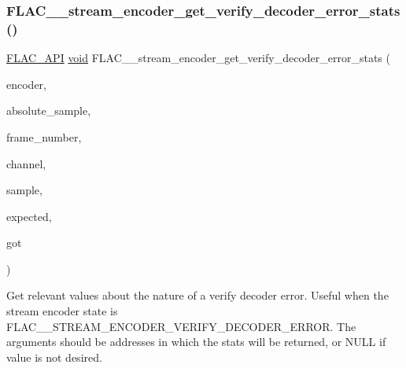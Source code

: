 \subsubsection{\texorpdfstring{FLAC\_\_stream\_encoder\_get\_verify\_decoder\_error\_stats()}{FLAC\_\_stream\_encoder\_get\_verify\_decoder\_error\_stats()}}
{\footnotesize\ttfamily \mbox{\hyperlink{group__flac__export_ga56ca07df8a23310707732b1c0007d6f5}{F\+L\+A\+C\+\_\+\+A\+PI}} \mbox{\hyperlink{_s_d_l__opengles2__gl2ext_8h_ae5d8fa23ad07c48bb609509eae494c95}{void}} F\+L\+A\+C\+\_\+\+\_\+stream\+\_\+encoder\+\_\+get\+\_\+verify\+\_\+decoder\+\_\+error\+\_\+stats (\begin{DoxyParamCaption}\item[{const \mbox{\hyperlink{struct_f_l_a_c_____stream_encoder}{F\+L\+A\+C\+\_\+\+\_\+\+Stream\+Encoder}} $\ast$}]{encoder,  }\item[{\mbox{\hyperlink{ordinals_8h_aa78c8c70a3eb8a58af7436f278acde8e}{F\+L\+A\+C\+\_\+\+\_\+uint64}} $\ast$}]{absolute\+\_\+sample,  }\item[{unsigned $\ast$}]{frame\+\_\+number,  }\item[{unsigned $\ast$}]{channel,  }\item[{unsigned $\ast$}]{sample,  }\item[{\mbox{\hyperlink{ordinals_8h_a33fd77bfe6d685541a0c034a75deccdc}{F\+L\+A\+C\+\_\+\+\_\+int32}} $\ast$}]{expected,  }\item[{\mbox{\hyperlink{ordinals_8h_a33fd77bfe6d685541a0c034a75deccdc}{F\+L\+A\+C\+\_\+\+\_\+int32}} $\ast$}]{got }\end{DoxyParamCaption})}

Get relevant values about the nature of a verify decoder error. Useful when the stream encoder state is {\ttfamily F\+L\+A\+C\+\_\+\+\_\+\+S\+T\+R\+E\+A\+M\+\_\+\+E\+N\+C\+O\+D\+E\+R\+\_\+\+V\+E\+R\+I\+F\+Y\+\_\+\+D\+E\+C\+O\+D\+E\+R\+\_\+\+E\+R\+R\+OR}. The arguments should be addresses in which the stats will be returned, or N\+U\+LL if value is not desired.


